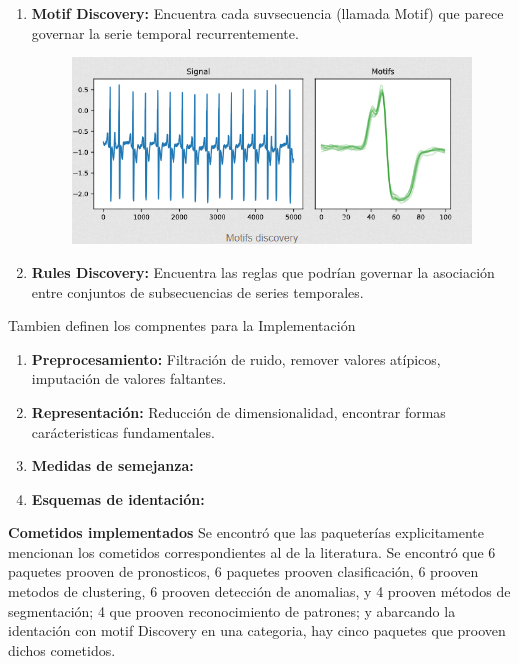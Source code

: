 \documentclass[a4paper, 11pt]{article}
\begin{document}
\begin{enumerate}
\begin{figure}[H]
        \label{Fig. 6}
    \end{figure} 
    \item \textbf{Motif Discovery: } Encuentra cada suvsecuencia (llamada Motif) que parece governar la serie temporal recurrentemente.
    \begin{figure}[H] 
        \centering 
        \includegraphics[width = 10 cm ]{Figures/T6.png} 
        \label{Fig. 7}
    \end{figure} 
    \item \textbf{Rules Discovery: } Encuentra las reglas que podrían governar la asociación entre conjuntos de subsecuencias de series temporales.
\end{enumerate}

Tambien definen los compnentes para la Implementación
\begin{enumerate}
    \item \textbf{Preprocesamiento: } Filtración de ruido, remover valores atípicos, imputación de valores faltantes.
    \item \textbf{Representación: } Reducción de dimensionalidad, encontrar formas carácteristicas fundamentales.
    \item \textbf{Medidas de semejanza:}
    \item \textbf{Esquemas de identación:}
\end{enumerate}

\textbf{Cometidos implementados} Se encontró que las paqueterías explicitamente mencionan los cometidos correspondientes al de la literatura. Se encontró que 6 paquetes prooven de pronosticos, 6 paquetes prooven clasificación, 6 prooven metodos de clustering, 6 prooven detección de anomalias, y 4 prooven métodos de segmentación; 4 que prooven reconocimiento de patrones; y abarcando la identación con motif Discovery en una categoria, hay cinco paquetes que prooven dichos cometidos.
\end{document}
